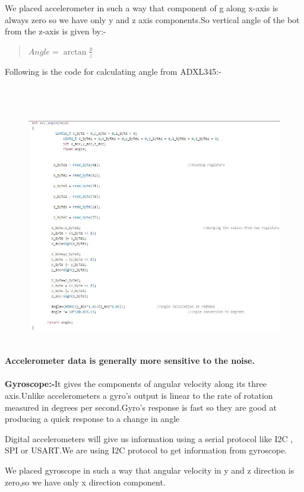 \documentclass[12pt]{report}
\begin{document}
We placed accelerometer in such a way that component of g along x-axis is always zero so we have only y and z axis components.So vertical angle of the bot from the z-axis is given by:- \\
\begin{quote}
\centering	$ Angle =\arctan {\frac{y}{z}} $
\end{quote}
Following is the code for calculating angle from ADXL345:-\\ \\ \\ \\
\begin{figure}[h]
	\includegraphics[scale=0.7]{acc.jpg}
\end{figure}\\
\textbf{Accelerometer data is generally more sensitive to the noise.}\\ \\
\textbf{Gyroscope:-}It gives the components of angular
velocity along its three axis.Unlike accelerometers a gyro's output is linear to the rate of rotation measured in degrees per second.Gyro's response is fast so they are good at producing a quick response to a change in angle

Digital accelerometers will give us information using a serial protocol like I2C , SPI or USART.We are using I2C protocol to get information from gyroscope.

We placed gyroscope in such a way that angular velocity in y and z direction is zero,so we have only x direction component. \\
\end{document}
